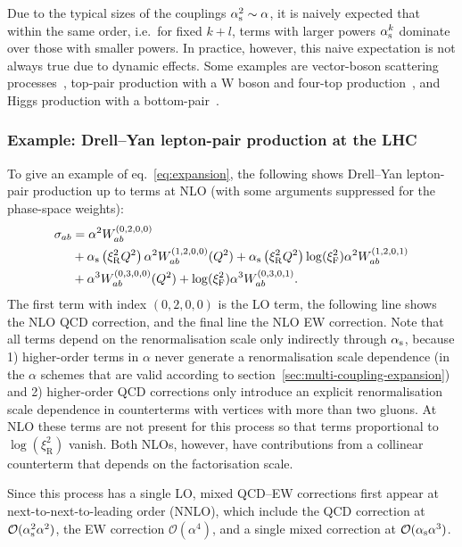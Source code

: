Due to the typical sizes of the couplings $\alpha_\mathrm{s}^2 \sim \alpha$, it is naively expected that within the same order, i.e.\ for fixed $k + l$, terms with larger powers $\alpha_\mathrm{s}^k$ dominate over those with smaller powers.
In practice, however, this naive expectation is not always true due to dynamic effects.
Some examples are vector-boson scattering processes~\cite{Biedermann:2017bss,Denner:2019tmn}, top-pair production with a W boson and four-top production~\cite{Frederix:2017wme}, and Higgs production with a bottom-pair~\cite{Pagani:2020rsg}.

\subsubsection{Example: Drell--Yan lepton-pair production at the LHC}
\label{sec:pineappl-example}

To give an example of eq.~\eqref{eq:expansion}, the following shows Drell--Yan lepton-pair production up to terms at NLO (with some arguments suppressed for the phase-space weights):
\begin{equation}
\begin{split}
\sigma_{ab}
    &= \alpha^2 W_{ab}^{(0,2,0,0)} \\
    &+ \alpha_\mathrm{s} \left( \xi_\mathrm{R}^2 Q^2 \right) \alpha^2 W_{ab}^{(1,2,0,0)} (Q^2) + \alpha_\mathrm{s} \left( \xi_\mathrm{R}^2 Q^2 \right) \log (\xi_\mathrm{F}^2) \alpha^2 W_{ab}^{(1,2,0,1)} \\
    &+ \alpha^3 W_{ab}^{(0,3,0,0)} (Q^2) + \log (\xi_\mathrm{F}^2) \alpha^3 W_{ab}^{(0,3,0,1)} \text{.}
\end{split}
\end{equation}
The first term with index $(0,2,0,0)$ is the LO term, the following line shows the NLO QCD correction, and the final line the NLO EW correction.
Note that all terms depend on the renormalisation scale only indirectly through $\alpha_\mathrm{s}$, because 1) higher-order terms in $\alpha$ never generate a renormalisation scale dependence (in the $\alpha$ schemes that are valid according to section~\ref{sec:multi-coupling-expansion}) and 2) higher-order QCD corrections only introduce an explicit renormalisation scale dependence in counterterms with vertices with more than two gluons.
At NLO these terms are not present for this process so that terms proportional to $\log (\xi_\mathrm{R}^2)$ vanish.
Both NLOs, however, have contributions from a collinear counterterm that depends on the factorisation scale.

Since this process has a single LO, mixed QCD--EW corrections first appear at next-to-next-to-leading order (NNLO), which include the QCD correction at $\mathcal{O} (\alpha_\mathrm{s}^2 \alpha^2)$, the EW correction $\mathcal{O} (\alpha^4)$, and a single mixed correction at $\mathcal{O} (\alpha_\mathrm{s} \alpha^3)$.

